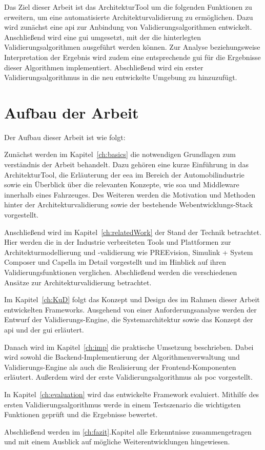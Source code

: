 Das Ziel dieser Arbeit ist das ArchitekturTool um die folgenden Funktionen zu erweitern, um eine automatisierte Architekturvalidierung zu ermöglichen. Dazu wird zunächst eine \gls{api} zur Anbindung von Validierungsalgorithmen entwickelt. Anschließend wird eine \gls{gui} umgesetzt, mit der die hinterlegten Validierungsalgorithmen ausgeführt werden können. Zur Analyse beziehungsweise Interpretation der Ergebnis wird zudem eine entsprechende \gls{gui} für die Ergebnisse dieser Algorithmen implementiert. Abschließend wird ein erster Validierungsalgorithmus in die neu entwickelte Umgebung zu hinzuzufügt.
\section{Aufbau der Arbeit}
\label{sec:aufbau}

Der Aufbau dieser Arbeit ist wie folgt:

Zunächst werden im Kapitel~\ref{ch:basics} die notwendigen Grundlagen zum verständnis der Arbeit behandelt. Dazu gehören eine kurze Einführung in das ArchitekturTool, die Erläuterung der \gls{eea} im Bereich der Automobilindustrie sowie ein Überblick über die relevanten Konzepte, wie \gls{soa} und Middleware innerhalb eines Fahrzeuges. Des Weiteren werden die Motivation und Methoden hinter der Architekturvalidierung sowie der bestehende Webentwicklungs-Stack vorgestellt.

Anschließend wird im Kapitel~\ref{ch:relatedWork} der Stand der Technik betrachtet. Hier werden die in der Industrie verbreiteten Tools und Plattformen zur Architekturmodellierung und -validierung wie PREEvision, Simulink + System Composer und Capella im Detail vorgestellt und im Hinblick auf ihren Validierungsfunktionen verglichen. Abschließend werden die verschiedenen Ansätze zur Architekturvalidierung betrachtet.

Im Kapitel~\ref{ch:KuD} folgt das Konzept und Design des im Rahmen dieser Arbeit entwickelten Frameworks. Ausgehend von einer Anforderungsanalyse werden der Entwurf der Validierungs-Engine, die Systemarchitektur sowie das Konzept der \gls{api} und der \gls{gui} erläutert.

Danach wird im Kapitel~\ref{ch:imp} die praktische Umsetzung beschrieben. Dabei wird sowohl die Backend-Implementierung der Algorithmenverwaltung und Validierungs-Engine als auch die Realisierung der Frontend-Komponenten erläutert. Außerdem wird der erste Validierungsalgorithmus als \gls{poc} vorgestellt.

In Kapitel~\ref{ch:evaluation} wird das entwickelte Framework evaluiert. Mithilfe des ersten Validierungsalgorithmus werde in einem Testszenario die wichtigsten Funktionen geprüft und die Ergebnisse bewertet.

Abschließend werden im \ref{ch:fazit}.Kapitel alle Erkenntnisse zusammengetragen und mit einem Ausblick auf mögliche Weiterentwicklungen hingewiesen.